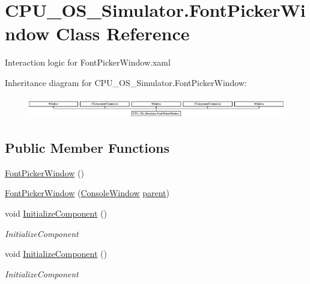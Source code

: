 \hypertarget{class_c_p_u___o_s___simulator_1_1_font_picker_window}{}\section{C\+P\+U\+\_\+\+O\+S\+\_\+\+Simulator.\+Font\+Picker\+Window Class Reference}
\label{class_c_p_u___o_s___simulator_1_1_font_picker_window}


Interaction logic for Font\+Picker\+Window.\+xaml  


Inheritance diagram for C\+P\+U\+\_\+\+O\+S\+\_\+\+Simulator.\+Font\+Picker\+Window\+:\begin{figure}[H]
\begin{center}
\leavevmode
\includegraphics[height=0.941176cm]{class_c_p_u___o_s___simulator_1_1_font_picker_window}
\end{center}
\end{figure}
\subsection*{Public Member Functions}
\begin{DoxyCompactItemize}
\item 
\hyperlink{class_c_p_u___o_s___simulator_1_1_font_picker_window_ac395cdfa521446c47bfded624bbfdba6}{Font\+Picker\+Window} ()
\item 
\hyperlink{class_c_p_u___o_s___simulator_1_1_font_picker_window_a8ff9dfbc882890c0b7b76468d51dd386}{Font\+Picker\+Window} (\hyperlink{class_c_p_u___o_s___simulator_1_1_console_window}{Console\+Window} \hyperlink{class_c_p_u___o_s___simulator_1_1_font_picker_window_a4e59cc593e060f3229adc8decfeb151c}{parent})
\item 
void \hyperlink{class_c_p_u___o_s___simulator_1_1_font_picker_window_aca751fede84bf642f74ddf1030cbf034}{Initialize\+Component} ()
\begin{DoxyCompactList}\small\item\em Initialize\+Component \end{DoxyCompactList}\item 
void \hyperlink{class_c_p_u___o_s___simulator_1_1_font_picker_window_aca751fede84bf642f74ddf1030cbf034}{Initialize\+Component} ()
\begin{DoxyCompactList}\small\item\em Initialize\+Component \end{DoxyCompactList}\end{DoxyCompactItemize}
